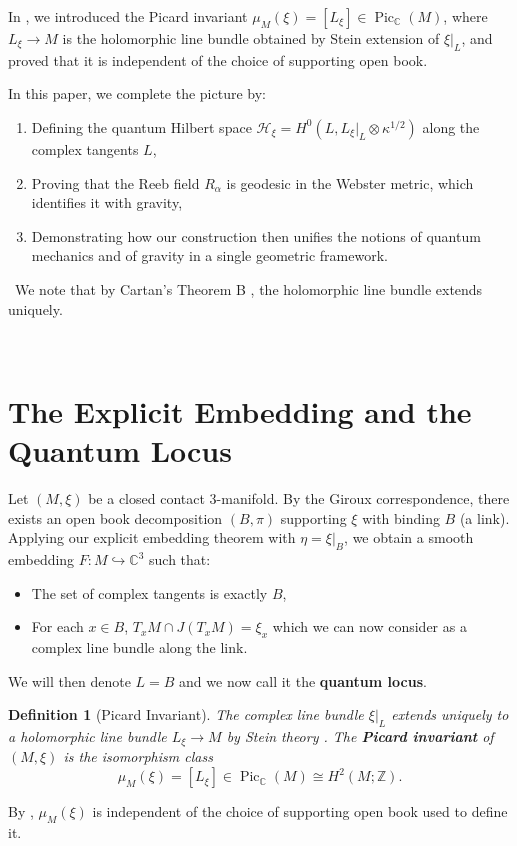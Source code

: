 \documentclass[12pt]{article}
\newtheorem{definition}[theorem]{Definition}
\newcommand{\C}{\mathbb{C}}
\newcommand{\Z}{\mathbb{Z}}
\newcommand{\Hilb}{\mathcal{H}}
\newcommand{\Pic}{\operatorname{Pic}}
\begin{document}
In \cite{Elgindi2026}, we introduced the Picard invariant $\mu_M(\xi) = [L_\xi] \in \Pic_\C(M)$, where $L_\xi \to M$ is the holomorphic line bundle obtained by Stein extension of $\xi|_L$, and proved that it is independent of the choice of supporting open book.

In this paper, we complete the picture by:
\begin{enumerate}
\item Defining the quantum Hilbert space $\Hilb_\xi = H^0(L, L_\xi|_L \otimes \kappa^{1/2})$ along the complex tangents $L$,
\item Proving that the Reeb field $R_\alpha$ is geodesic in the Webster metric, which identifies it with gravity,
\item Demonstrating how our construction then unifies the notions of quantum mechanics and of gravity in a single geometric framework.

\end{enumerate}
\par\
We note that by Cartan's Theorem B \cite{Cartan1953}, the holomorphic line bundle extends uniquely.  

\par\

\section{The Explicit Embedding and the Quantum Locus}

Let $(M,\xi)$ be a closed contact 3-manifold. By the Giroux correspondence, there exists an open book decomposition $(B,\pi)$ supporting $\xi$ with binding $B$ (a link). Applying our explicit embedding theorem \cite{Elgindi2025} with $\eta = \xi|_B$, we obtain a smooth embedding $F: M \hookrightarrow \C^3$ such that:
\begin{itemize}
\item The set of complex tangents is exactly $B$,
\item For each $x \in B$, $T_xM \cap J(T_xM) = \xi_x$ which we can now consider as a complex line bundle along the link. 
\end{itemize}
We will then denote $L = B$ and we now call it the \textbf{quantum locus}.

\begin{definition}[Picard Invariant]
The complex line bundle $\xi|_L$ extends uniquely to a holomorphic line bundle $L_\xi \to M$ by Stein theory \cite{CieliebakEliashberg2012}. The \textbf{Picard invariant} of $(M,\xi)$ is the isomorphism class
\[
\mu_M(\xi) = [L_\xi] \in \Pic_\C(M) \cong H^2(M;\Z).
\]
\end{definition}
By \cite{Elgindi2026}, $\mu_M(\xi)$ is independent of the choice of supporting open book used to define it.
\end{document}
